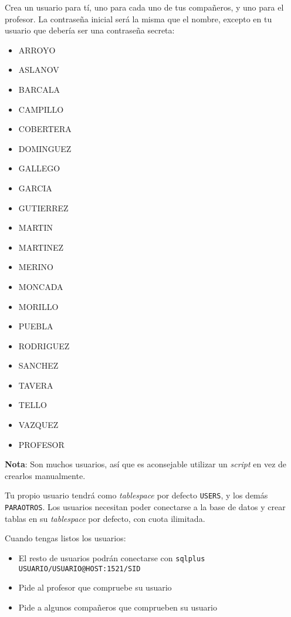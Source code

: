 \begin{homeworkProblem}

  Crea un usuario para tí, uno para cada uno de tus compañeros, y uno para el profesor. La contraseña inicial será la misma que el nombre, excepto en tu usuario que debería ser una contraseña secreta:
  \begin{multicols}{3}
    \begin{itemize}
    \item ARROYO   
    \item ASLANOV  
    \item BARCALA  
    \item CAMPILLO 
    \item COBERTERA
    \item DOMINGUEZ
    \item GALLEGO  
    \item GARCIA   
    \item GUTIERREZ
    \item MARTIN   
    \item MARTINEZ 
    \item MERINO   
    \item MONCADA        
    \item MORILLO  
    \item PUEBLA   
    \item RODRIGUEZ
    \item SANCHEZ  
    \item TAVERA   
    \item TELLO    
    \item VAZQUEZ  
    \item PROFESOR
    \end{itemize}
  \end{multicols}
  {\small \textbf{Nota}: Son muchos usuarios, así que es aconsejable utilizar un \textit{script} en vez de crearlos manualmente.}

  Tu propio usuario tendrá como \textit{tablespace} por defecto \texttt{USERS}, y los demás \texttt{PARAOTROS}. Los usuarios necesitan poder conectarse a la base de datos y crear tablas en su \textit{tablespace} por defecto, con cuota ilimitada.
  
  Cuando tengas listos los usuarios:
  \begin{itemize}
    \item El resto de usuarios podrán conectarse con \texttt{sqlplus USUARIO/USUARIO@HOST:1521/SID}
    \item Pide al profesor que compruebe su usuario
    \item Pide a algunos compañeros que comprueben su usuario
  \end{itemize}
\end{homeworkProblem}


